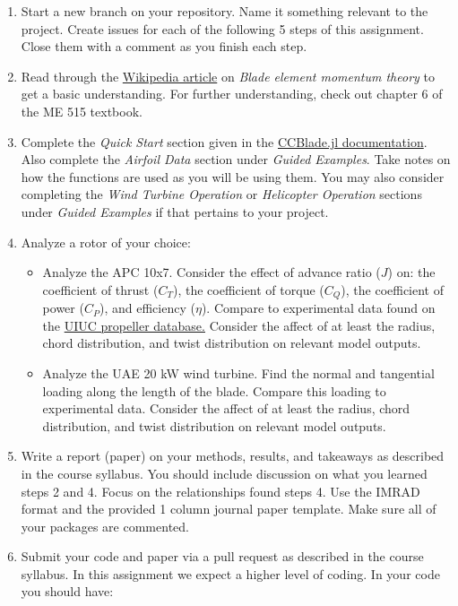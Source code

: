 \documentclass[12pt]{article}
\begin{document}
	\begin{enumerate}
		\item Start a new branch on your repository. Name it something relevant to the project. Create issues for each of the following 5 steps of this assignment. Close them with a comment as you finish each step. 
		\item Read  through the \href{https://en.wikipedia.org/wiki/Blade_element_momentum_theory}{Wikipedia article} on \textit{Blade element momentum theory} to get a basic understanding. For further understanding, check out chapter 6 of the ME 515 textbook. 
		\item Complete the \textit{Quick Start} section given in the \href{https://flow.byu.edu/CCBlade.jl/stable/}{CCBlade.jl documentation}. Also complete the \textit{Airfoil Data} section under \textit{Guided Examples}. Take notes on how the functions are used as you will be using them.  You may also consider completing the \textit{Wind Turbine Operation} or \textit{Helicopter Operation} sections under \textit{Guided Examples} if that pertains to your project. 
		\item Analyze a rotor of your choice:
		\begin{itemize}
			\item Analyze the APC 10x7. Consider the effect of advance ratio ($J$) on: the coefficient of thrust ($C_T$), the coefficient of torque ($C_Q$), the coefficient of power ($C_P$), and efficiency ($\eta$).  Compare to experimental data found on the \href{https://m-selig.ae.illinois.edu/props/propDB.html}{UIUC propeller database.} Consider the affect of at least the radius, chord distribution, and twist distribution on relevant model outputs. 
			\item Analyze the UAE 20 kW wind turbine. Find the normal and tangential loading along the length of the blade. Compare this loading to experimental data. Consider the affect of at least the radius, chord distribution, and twist distribution on relevant model outputs.  %
		\end{itemize}
		\item Write a report (paper) on your methods, results, and takeaways as described in the course syllabus. You should include discussion on what you learned steps 2 and 4.  Focus on the relationships found steps 4.  Use the IMRAD format and the provided 1 column journal paper template. Make sure all of your packages are commented. 
		\item Submit your code and paper via a pull request as described in the course syllabus. In this assignment we expect a higher level of coding. In your code you should have: 

\end{enumerate}
\end{document}
